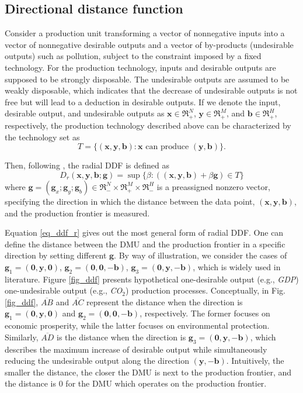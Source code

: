 \subsection{Directional distance function}
Consider a production unit transforming a vector of nonnegative inputs into a vector of nonnegative desirable outputs and a vector of by-products (undesirable outputs) such as pollution, subject to the constraint imposed by a fixed technology. For the production technology, inputs and desirable outputs are supposed to be strongly disposable. The undesirable outputs are assumed to be weakly disposable, which indicates that the decrease of undesirable outputs is not free but will lead to a deduction in desirable outputs.
If we denote the input, desirable output, and undesirable outputs as $\pmb{x} \in \Re _ + ^N$,  $\pmb{y} \in \Re _ + ^M$, and $\pmb{b} \in \Re _ + ^H$, respectively, the production technology described above can be characterized by the technology set as
\begin{equation}\label{eq_tech}
    T = \{ (\pmb{x},\pmb{y},\pmb{b}) : \pmb{x} \text{ can produce } (\pmb{y},\pmb{b}) \}.
\end{equation}

Then, following \cite{Chung1997}, the radial DDF is defined as
\begin{equation}\label{eq_ddf_r}
    D_r (\pmb{x},\pmb{y},\pmb{b};\pmb{g}) = \sup \{ \beta :((\pmb{x},\pmb{y},\pmb{b}) + \beta \pmb{g}) \in T  \} 
\end{equation}
where $\pmb{g} = (\pmb{g}_x;\pmb{g}_y; \pmb{g}_b) \in \Re _ - ^N \times \Re _ + ^M \times \Re _ - ^H$ is a preassigned nonzero vector, specifying the direction in which the distance between the data point, $(\pmb{x},\pmb{y},\pmb{b})$, and the production frontier is measured. 

Equation \eqref{eq_ddf_r} gives out the most general form of radial DDF. One can define the distance between the DMU and the production frontier in a specific direction by setting different $\pmb{g}$. By way of illustration, we consider the cases of  ${\pmb{g}_1} = (\pmb{0},\pmb{y},\pmb{0})$, ${\pmb{g}_2} = (\pmb{0},\pmb{0},-\pmb{b})$, ${\pmb{g}_3} = (\pmb{0},\pmb{y},-\pmb{b})$, which is widely used in literature. 
Figure \ref{fig_ddf} presents hypothetical one-desirable output (e.g., \textit{GDP}) one-undesirable output (e.g., \textit{CO$_2$}) production processes. 
Conceptually, in Fig. \ref{fig_ddf}, $\overline{\textit{AB}}$ and $\overline{\textit{AC}}$ represent the distance when the direction is ${\pmb{g}_1} = (\pmb{0},\pmb{y},\pmb{0})$ and ${\pmb{g}_2} = (\pmb{0},\pmb{0}, - \pmb{b})$, respectively. The former focuses on economic prosperity, while the latter focuses on environmental protection. Similarly, $\overline{\textit{AD}}$ is the distance when the direction is ${\pmb{g}_3} = (\pmb{0},\pmb{y}, - \pmb{b})$, which describes the maximum increase of desirable output while simultaneously reducing the undesirable output along the direction $(\pmb{y}, - \pmb{b})$. 
Intuitively, the smaller the distance, the closer the DMU is next to the production frontier, and the distance is 0 for the DMU which operates on the production frontier.

